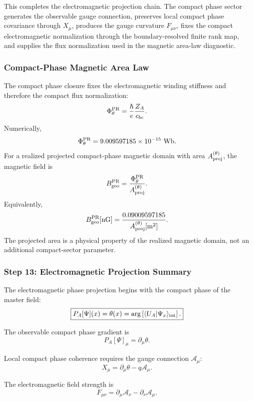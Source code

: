 \documentclass[11pt]{article}
\begin{document}
This completes the electromagnetic projection chain. The compact phase sector
generates the observable gauge connection, preserves local compact phase
covariance through \(X_\mu\), produces the gauge curvature \(F_{\mu\nu}\), fixes
the compact electromagnetic normalization through the boundary-resolved finite
rank map, and supplies the flux normalization used in the magnetic area-law
diagnostic.

\subsubsection{Compact-Phase Magnetic Area Law}

The compact phase closure fixes the electromagnetic winding stiffness and
therefore the compact flux normalization:
\[
\Phi_\theta^{\rm PR}
=
\frac{\hbar}{e}\frac{Z_A}{c_{bc}}.
\]
Numerically,
\[
\Phi_\theta^{\rm PR}
=
9.009597185\times10^{-15}\ {\rm Wb}.
\]
For a realized projected compact-phase magnetic domain with area
\(A_{\rm proj}^{(\theta)}\), the magnetic field is
\[
B_{\rm geo}^{\rm PR}
=
\frac{\Phi_\theta^{\rm PR}}
{A_{\rm proj}^{(\theta)}}.
\]
Equivalently,
\[
B_{\rm geo}^{\rm PR}[{\rm nG}]
=
\frac{0.09009597185}
{A_{\rm proj}^{(\theta)}[{\rm m^2}]}.
\]
The projected area is a physical property of the realized magnetic domain,
not an additional compact-sector parameter.

\subsubsection{Step 13: Electromagnetic Projection Summary}

The electromagnetic phase projection begins with the compact phase of the
master field:
\begin{equation}
\boxed{
P_A[\Psi](x)
=
\theta(x)
=
\arg
\left[
\langle U_A|\Psi_x\rangle_{\rm int}
\right].
}
\end{equation}

The observable compact phase gradient is
\begin{equation}
\boxed{
P_A[\Psi]_\mu
=
\partial_\mu\theta.
}
\end{equation}

Local compact phase coherence requires the gauge connection \(\mathcal A_\mu\):
\begin{equation}
\boxed{
X_\mu
=
\partial_\mu\theta
-
q\mathcal A_\mu.
}
\end{equation}

The electromagnetic field strength is
\begin{equation}
\boxed{
F_{\mu\nu}
=
\partial_\mu\mathcal A_\nu
-
\partial_\nu\mathcal A_\mu.
}
\end{equation}
\end{document}
